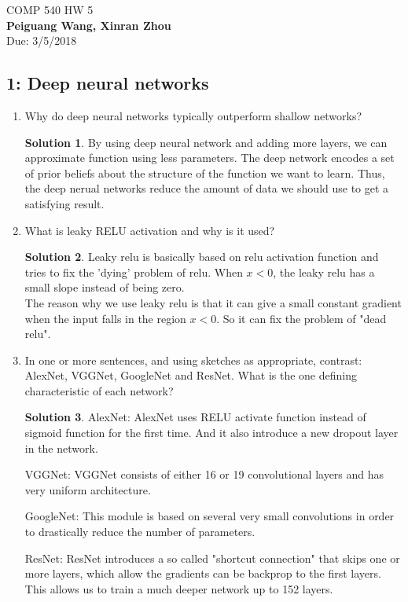 \documentclass[]{book}
\theoremstyle{definition}
\newtheorem*{soln}{Solution}
\begin{document}
\begin{center}
{\Large COMP 540 \hspace{0.5cm} HW 5}\\
\textbf{Peiguang Wang, Xinran Zhou}\\ %
Due: 3/5/2018 %
\end{center}

\vspace{0.2 cm}


\subsection*{1: Deep neural networks }
\begin{enumerate}
	\item Why do deep neural networks typically outperform shallow networks?
	\begin{soln}
		By using deep neural network and adding more layers, we can approximate function using less parameters.
		The deep network encodes a set of prior beliefs about the structure of the function we want to learn. Thus, the deep nerual networks reduce the amount of data we should use to get a satisfying result.
	\end{soln}
	\item What is leaky RELU activation and why is it used?
	\begin{soln}
		Leaky relu is basically based on relu activation function and tries to fix the 'dying' problem of relu. When $x<0$, the leaky relu has a small slope instead of being zero.\\
		The reason why we use leaky relu is that it can give a small constant gradient when the input falls in the region $x<0$. So it can fix the problem of "dead relu". 
	\end{soln}
	\item In one or more sentences, and using sketches as appropriate, contrast: AlexNet, VGGNet, GoogleNet and ResNet. What is the one defining characteristic of each network?
	\begin{soln}
		AlexNet: AlexNet uses RELU activate function instead of sigmoid function for the first time. And it also introduce a new dropout layer in the network.
		
		VGGNet: VGGNet consists of either 16 or 19 convolutional layers and has very uniform architecture.
		
		GoogleNet: This module is based on several very small convolutions in order to drastically reduce the number of parameters. 
		
		ResNet: ResNet introduces a so called "shortcut connection" that skips one or more layers, which allow the gradients can be backprop to the first layers. This allows us to train a much deeper network up to 152 layers.
	\end{soln}
	
\end{enumerate}
\end{document}

